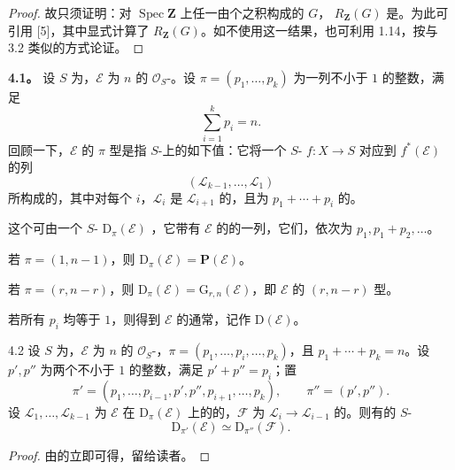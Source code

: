 \begin{proof}
故只须证明：对 $\operatorname{Spec}\mathbf Z$ 上任一由个之积构成的 $G$， $R_{\mathbf Z}(G)$ 是。为此可引用 [5]，其中显式计算了 $R_{\mathbf Z}(G)$。如不使用这一结果，也可利用 1.14，按与 3.2 类似的方式论证。
\end{proof}

\textbf{4.1。} 设 $S$ 为，$\mathcal E$ 为 $n$ 的 $\mathcal O_S$-。设 $\pi=(p_1,\ldots,p_k)$ 为一列不小于 $1$ 的整数，满足
\[
\sum_{i=1}^k p_i=n.
\]
回顾一下，$\mathcal E$ 的 $\pi$ 型是指 $S$-上的如下值：它将一个 $S$- $f\colon X\longrightarrow S$ 对应到 $f^*(\mathcal E)$ 的列
\[
(\mathcal L_{k-1},\ldots,\mathcal L_1)
\]
所构成的，其中对每个 $i$，$\mathcal L_i$ 是 $\mathcal L_{i+1}$ 的，且为 $p_1+\cdots+p_i$ 的。

这个可由一个 $S$- $\mathrm D_\pi(\mathcal E)$ ，它带有 $\mathcal E$ 的的一列，它们，依次为 $p_1,p_1+p_2,\ldots$。

若 $\pi=(1,n-1)$，则 $\mathrm D_\pi(\mathcal E)=\mathbf P(\mathcal E)$。

若 $\pi=(r,n-r)$，则 $\mathrm D_\pi(\mathcal E)=\mathrm G_{r,n}(\mathcal E)$，即 $\mathcal E$ 的 $(r,n-r)$ 型。

若所有 $p_i$ 均等于 $1$，则得到 $\mathcal E$ 的通常，记作 $\mathrm D(\mathcal E)$。

\begin{SGAresult}{}{4.2}
设 $S$ 为，$\mathcal E$ 为 $n$ 的 $\mathcal O_S$-，$\pi=(p_1,\ldots,p_i,\ldots,p_k)$，且 $p_1+\cdots+p_k=n$。设 $p',p''$ 为两个不小于 $1$ 的整数，满足 $p'+p''=p_i$；置
\[
\pi'=(p_1,\ldots,p_{i-1},p',p'',p_{i+1},\ldots,p_k),\qquad \pi''=(p',p'').
\]
设 $\mathcal L_1,\ldots,\mathcal L_{k-1}$ 为 $\mathcal E$ 在 $\mathrm D_\pi(\mathcal E)$ 上的的，$\mathcal F$ 为 $\mathcal L_i\longrightarrow\mathcal L_{i-1}$ 的。则有的 $S$-
\[
\mathrm D_{\pi'}(\mathcal E)\simeq\mathrm D_{\pi''}(\mathcal F).
\]
\end{SGAresult}
\begin{proof}
由的立即可得，留给读者。
\end{proof}

